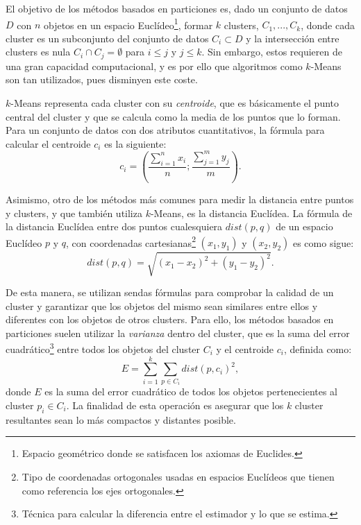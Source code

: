 \documentclass[10pt, a4paper]{article}
\begin{document}
El objetivo de los métodos basados en particiones es, dado un conjunto de datos $D$ con $n$ objetos en un espacio Euclídeo\footnote{Espacio geométrico donde se satisfacen los axiomas de Euclides.}, formar $k$ clusters, $C_{1}, ..., C_{k}$, donde cada cluster es un subconjunto del conjunto de datos $C_{i} \subset D$ y la intersección entre clusters es nula $C_{i} \cap C_{j} = \emptyset$ para $i \leq j$ y $j \leq k$. Sin embargo, estos requieren de una gran capacidad computacional, y es por ello que algoritmos como $k$-Means son tan utilizados, pues disminyen este coste.

$k$-Means representa cada cluster con su \textit{centroide}, que es básicamente el punto central del cluster y que se calcula como la media de los puntos que lo forman. Para un conjunto de datos con dos atributos cuantitativos, la fórmula para calcular el centroide $c_{i}$ es la siguiente: \begin{equation} c_{i} = \left( \frac{\sum _{i=1}^n x_{i}}{n}; \frac{\sum _{j=1}^m y_{j}}{m} \right). \end{equation} 

Asimismo, otro de los métodos más comunes para medir la distancia entre puntos y clusters, y que también utiliza $k$-Means, es la distancia Euclídea. La fórmula de la distancia Euclídea entre dos puntos cualesquiera $dist(p, q)$ de un espacio Euclídeo $p$ y $q$, con coordenadas cartesianas\footnote{Tipo de coordenadas ortogonales usadas en espacios Euclídeos que tienen como referencia los ejes ortogonales.} $(x_{1}, y_{1})$ y $(x_{2}, y_{2})$ es como sigue: \begin{equation}  dist\left( p,q\right) =  \sqrt{ \left(x_1-x_2 \right)^2 + \left(y_1 - y_2 \right)^2}. \end{equation} 

De esta manera, se utilizan sendas fórmulas para comprobar la calidad de un cluster y garantizar que los objetos del mismo sean similares entre ellos y diferentes con los objetos de otros clusters. Para ello, los métodos basados en particiones suelen utilizar la \textit{varianza} dentro del cluster, que es la suma del error cuadrático\footnote{Técnica para calcular la diferencia entre el estimador y lo que se estima.} entre todos los objetos del cluster $C_i$ y el centroide $c_i$, definida como: \begin{equation} E =  \sum_{i=1}^{k}  \sum_{p \in C_i} dist(p, c_i)^2 , \end{equation} donde $E$ es la suma del error cuadrático de todos los objetos pertenecientes al cluster $p_i \in C_i$. La finalidad de esta operación es asegurar que los $k$ cluster resultantes sean lo más compactos y distantes posible.
\end{document}

